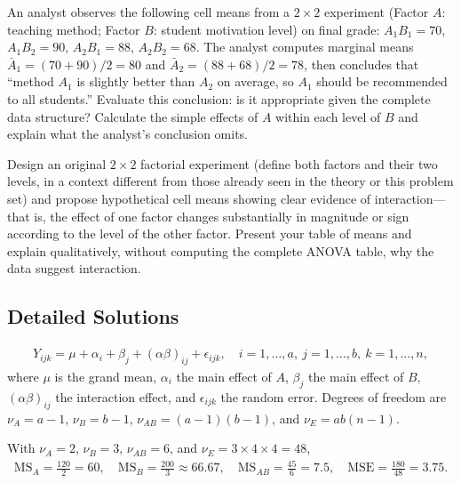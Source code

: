 \begin{problema}
\label{prob:5ffa1be}
An analyst observes the following cell means from a $2\times2$ experiment (Factor $A$: teaching method; Factor $B$: student motivation level) on final grade: $A_1B_1=70$, $A_1B_2=90$, $A_2B_1=88$, $A_2B_2=68$. The analyst computes marginal means $\bar A_1=(70+90)/2=80$ and $\bar A_2=(88+68)/2=78$, then concludes that ``method $A_1$ is slightly better than $A_2$ on average, so $A_1$ should be recommended to all students.'' Evaluate this conclusion: is it appropriate given the complete data structure? Calculate the simple effects of $A$ within each level of $B$ and explain what the analyst's conclusion omits.
\end{problema}

\begin{problema}
\label{prob:fc779e7}
Design an original $2\times2$ factorial experiment (define both factors and their two levels, in a context different from those already seen in the theory or this problem set) and propose hypothetical cell means showing clear evidence of interaction—that is, the effect of one factor changes substantially in magnitude or sign according to the level of the other factor. Present your table of means and explain qualitatively, without computing the complete ANOVA table, why the data suggest interaction.
\end{problema}

\subsection*{Detailed Solutions}

\begin{solproblema}[prob:11b9df2]
\begin{align}
Y_{ijk}=\mu+\alpha_i+\beta_j+(\alpha\beta)_{ij}+\epsilon_{ijk},\quad i=1,\ldots,a,\ j=1,\ldots,b,\ k=1,\ldots,n,
\end{align}
where $\mu$ is the grand mean, $\alpha_i$ the main effect of $A$, $\beta_j$ the main effect of $B$, $(\alpha\beta)_{ij}$ the interaction effect, and $\epsilon_{ijk}$ the random error. Degrees of freedom are $\nu_A=a-1$, $\nu_B=b-1$, $\nu_{AB}=(a-1)(b-1)$, and $\nu_E=ab(n-1)$.
\end{solproblema}

\begin{solproblema}[prob:196fe5a]
With $\nu_A=2$, $\nu_B=3$, $\nu_{AB}=6$, and $\nu_E=3\times4\times4=48$,
\begin{align}
\text{MS}_A=\frac{120}{2}=60,\quad \text{MS}_B=\frac{200}{3}\approx66.67,\quad \text{MS}_{AB}=\frac{45}{6}=7.5,\quad \text{MSE}=\frac{180}{48}=3.75.
\end{align}
\end{solproblema}

